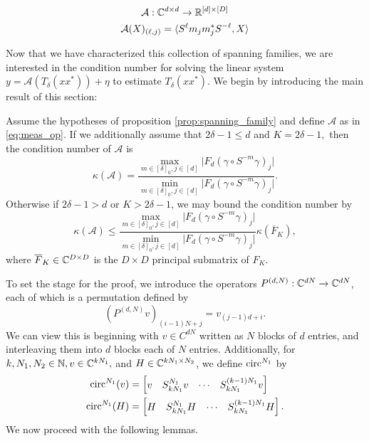 \begin{gather} \mathcal{A} : \mathbb{C}^{d \times d} \to \mathbb{R}^{[d] \times [D]} \nonumber \\ \mathcal{A}(X)_{(\ell, j)} = \langle S^{\ell} m_j m_j^* S^{-\ell}, X \rangle \label{eq:meas_op} \end{gather}

Now that we have characterized this collection of spanning families, we are interested in the condition number for solving the linear system $y = \mathcal{A}(T_{\delta}(xx^*)) + \eta$ to estimate $T_\delta(xx^*)$.  We begin by introducing the main result of this section:

\begin{proposition}
  Assume the hypotheses of proposition \ref{prop:spanning_family} and define $\mathcal{A}$ as in \eqref{eq:meas_op}.  If we additionally assume that $2 \delta - 1 \le d$ and $K = 2 \delta - 1,$ then the condition number of $\mathcal{A}$ is \begin{equation}\kappa(\mathcal{A}) = \dfrac{\max\limits_{m \in [\delta]_0, j \in [d]} \lvert F_d (\gamma \circ S^{-m} \gamma)_j \rvert}{\min\limits_{m \in [\delta]_0, j \in [d]} \lvert F_d (\gamma \circ S^{-m} \gamma)_j \rvert}.\label{eq:clean_cond}\end{equation}  Otherwise if $2 \delta - 1 > d$ or $K > 2 \delta - 1$, we may bound the condition number by \begin{equation}\kappa(\mathcal{A}) \le \dfrac{\max\limits_{m \in [\delta]_0, j \in [d]} \lvert F_d (\gamma \circ S^{-m} \gamma)_j \rvert}{\min\limits_{m \in [\delta]_0, j \in [d]} \lvert F_d (\gamma \circ S^{-m} \gamma)_j \rvert} \kappa(\overline{F}_K), \label{eq:messy_cond}\end{equation} where $\overline{F}_K \in \mathbb{C}^{D \times D}$ is the $D \times D$ principal submatrix of $F_K$.
\label{prop:span_fam_cond}
\end{proposition}

To set the stage for the proof, we introduce the operators $P^{(d, N)} : \mathbb{C}^{dN} \to \mathbb{C}^{dN}$, each of which is a permutation defined by \[(P^{(d, N)} v)_{(i - 1)N + j} = v_{(j - 1)d + i}.\]  We can view this is beginning with $v \in C^{dN}$ written as $N$ blocks of $d$ entries, and interleaving them into $d$ blocks each of $N$ entries.  Additionally, for $k, N_1, N_2 \in \mathbb{N}, v \in \mathbb{C}^{kN_1},$ and $H \in \mathbb{C}^{kN_1 \times N_2}$, we define $\operatorname{circ}^{N_1}$ by \begin{align*} \operatorname{circ}^{N_1}(v) &= \begin{bmatrix} v & S_{kN_1}^{N_1} v & \cdots & S_{kN_1}^{(k-1)N_1} v \end{bmatrix} \\ \operatorname{circ}^{N_1}(H) &= \begin{bmatrix} H & S_{k N_1}^{N_1} H & \cdots & S_{k N_1}^{(k-1) N_1}H \end{bmatrix}. \end{align*}  We now proceed with the following lemmas.

